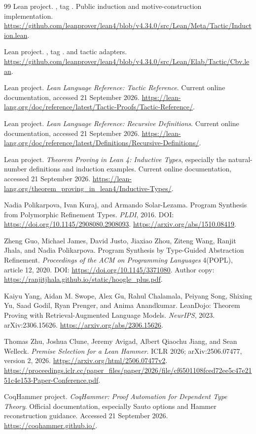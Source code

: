 \documentclass[11pt,a4paper]{article}
\newcommand{\code}[1]{\texttt{\detokenize{#1}}}
\theoremstyle{definition}
\theoremstyle{remark}
\begin{document}
\begin{thebibliography}{99}
Lean project. , tag \code{v4.34.0}.
Public induction and motive-construction implementation.
\url{https://github.com/leanprover/lean4/blob/v4.34.0/src/Lean/Meta/Tactic/Induction.lean}.

Lean project. , tag \code{v4.34.0}.
\code{cbv} and \code{decide_cbv} tactic adapters.
\url{https://github.com/leanprover/lean4/blob/v4.34.0/src/Lean/Elab/Tactic/Cbv.lean}.

Lean project. \emph{Lean Language Reference: Tactic Reference}.
Current online documentation, accessed 21 September 2026.
\url{https://lean-lang.org/doc/reference/latest/Tactic-Proofs/Tactic-Reference/}.

Lean project. \emph{Lean Language Reference: Recursive Definitions}.
Current online documentation, accessed 21 September 2026.
\url{https://lean-lang.org/doc/reference/latest/Definitions/Recursive-Definitions/}.

Lean project. \emph{Theorem Proving in Lean 4: Inductive Types}, especially the natural-number definitions and induction examples.
Current online documentation, accessed 21 September 2026.
\url{https://lean-lang.org/theorem_proving_in_lean4/Inductive-Types/}.

Nadia Polikarpova, Ivan Kuraj, and Armando Solar-Lezama.
Program Synthesis from Polymorphic Refinement Types.
\emph{PLDI}, 2016. DOI: \url{https://doi.org/10.1145/2908080.2908093}.
\url{https://arxiv.org/abs/1510.08419}.

Zheng Guo, Michael James, David Justo, Jiaxiao Zhou, Ziteng Wang, Ranjit Jhala, and Nadia Polikarpova.
Program Synthesis by Type-Guided Abstraction Refinement.
\emph{Proceedings of the ACM on Programming Languages} 4(POPL), article 12, 2020.
DOI: \url{https://doi.org/10.1145/3371080}.
Author copy: \url{https://ranjitjhala.github.io/static/hoogle_plus.pdf}.

Kaiyu Yang, Aidan M. Swope, Alex Gu, Rahul Chalamala, Peiyang Song, Shixing Yu, Saad Godil, Ryan Prenger, and Anima Anandkumar.
LeanDojo: Theorem Proving with Retrieval-Augmented Language Models.
\emph{NeurIPS}, 2023. arXiv:2306.15626.
\url{https://arxiv.org/abs/2306.15626}.

Thomas Zhu, Joshua Clune, Jeremy Avigad, Albert Qiaochu Jiang, and Sean Welleck.
\emph{Premise Selection for a Lean Hammer}.
ICLR 2026; arXiv:2506.07477, version 2, 2026.
\url{https://arxiv.org/html/2506.07477v2}.
\url{https://proceedings.iclr.cc/paper_files/paper/2026/file/cf6501108fced72ee5c47e2151c4e153-Paper-Conference.pdf}.


CoqHammer project. \emph{CoqHammer: Proof Automation for Dependent Type Theory}.
Official documentation, especially Sauto options and Hammer reconstruction guidance. Accessed 21 September 2026.
\url{https://coqhammer.github.io/}.

\end{thebibliography}
\end{document}
